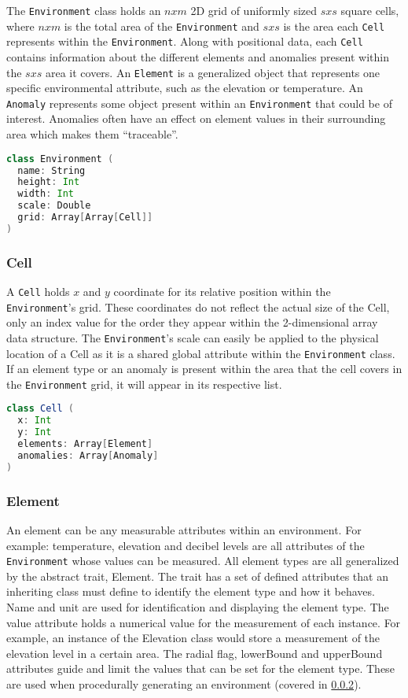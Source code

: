 The \texttt{Environment} class holds an $n x m$ 2D grid of uniformly sized $s x s$ square cells, where $n x m$ is the total area of the \texttt{Environment} and $s x s$ is the area each \texttt{Cell} represents within the \texttt{Environment}.
Along with positional data, each \texttt{Cell} contains information about the different elements and anomalies present within the $s x s$ area it covers.
An \texttt{Element} is a generalized object that represents one specific environmental attribute, such as the elevation or temperature.
An \texttt{Anomaly} represents some object present within an \texttt{Environment} that could be of interest.
Anomalies often have an effect on element values in their surrounding area which makes them “traceable”.


\begin{lstlisting}[language=Scala]
class Environment (
  name: String
  height: Int
  width: Int
  scale: Double
  grid: Array[Array[Cell]]
)
\end{lstlisting}

\subsubsection{Cell}
A \texttt{Cell} holds $x$ and $y$ coordinate for its relative position within the \texttt{Environment}'s grid.
These coordinates do not reflect the actual size of the Cell, only an index value for the order they appear within the 2-dimensional array data structure.
The \texttt{Environment}'s scale can easily be applied to the physical location of a Cell as it is a shared global attribute within the \texttt{Environment} class.
If an element type or an anomaly is present within the area that the cell covers in the \texttt{Environment} grid, it will appear in its respective list.

\begin{lstlisting}[language=Scala]
class Cell (
  x: Int
  y: Int
  elements: Array[Element]
  anomalies: Array[Anomaly]
)
\end{lstlisting}

\subsubsection{Element}
An element can be any measurable attributes within an environment.
For example: temperature, elevation and decibel levels are all attributes of the \texttt{Environment} whose values can be measured.
All element types are all generalized by the abstract trait, Element.
The trait has a set of defined attributes that an inheriting class must define to identify the element type and how it behaves.
Name and unit are used for identification and displaying the element type.
The value attribute holds a numerical value for the measurement of each instance.
For example, an instance of the Elevation class would store a measurement of the elevation level in a certain area.
The radial flag, lowerBound and upperBound attributes guide and limit the values that can be set for the element type.
These are used when procedurally generating an environment (covered in \ref{}). 

